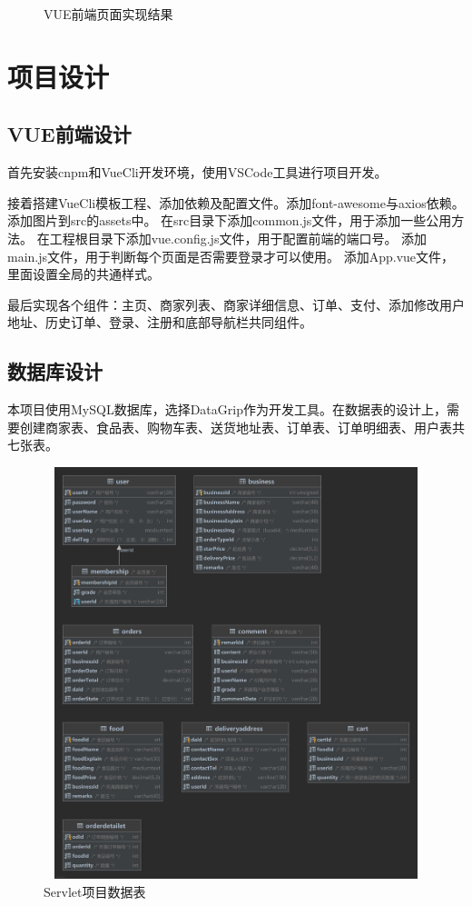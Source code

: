 \begin{figure}[H]
{\begin{minipage}[t]{0.22\linewidth}
        \end{minipage}
    }
    \centering
    \caption{VUE前端页面实现结果}
\end{figure}

\section{项目设计}

\subsection{VUE前端设计}
首先安装cnpm和VueCli开发环境，使用VSCode工具进行项目开发。

接着搭建VueCli模板工程、添加依赖及配置文件。添加font-awesome与axios依赖。
添加图片到src的assets中。
在src目录下添加common.js文件，用于添加一些公用方法。
在工程根目录下添加vue.config.js文件，用于配置前端的端口号。
添加main.js文件，用于判断每个页面是否需要登录才可以使用。
添加App.vue文件，里面设置全局的共通样式。

最后实现各个组件：主页、商家列表、商家详细信息、订单、支付、添加修改用户地址、历史订单、登录、注册和底部导航栏共同组件。~\\

\subsection{数据库设计}
本项目使用MySQL数据库，选择DataGrip作为开发工具。在数据表的设计上，需要创建商家表、食品表、购物车表、送货地址表、订单表、订单明细表、用户表共七张表。

\begin{figure}[H]
    \centering
    \includegraphics[width=15cm,height=12cm]{figures/table2.jpg}
    \caption{Servlet项目数据表}
\end{figure}

